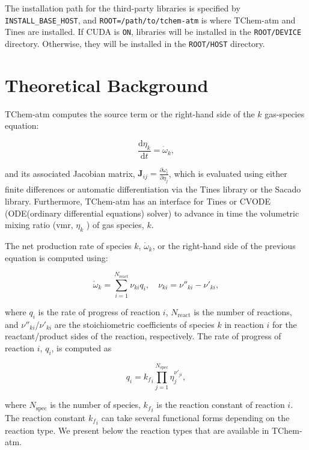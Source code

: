 \documentclass[report, 12pt]{SANDreport}
\newcommand{\dif}{\mathrm{d}}
\begin{document}
The installation path for the third-party libraries is specified by \verb|INSTALL_BASE_HOST|, and \verb|ROOT=/path/to/tchem-atm| is where TChem-atm and Tines are installed. If CUDA is \verb|ON|, libraries will be installed in the \verb|ROOT/DEVICE| directory. Otherwise, they will be installed in the \verb|ROOT/HOST| directory.

\chapter{Theoretical Background}
\label{ch:theo}
TChem-atm computes the source term or the right-hand side of the $k$ gas-species equation:

\begin{equation}\label{eq:ode_vmr}
  \frac{\dif{} \eta_k}{\dif{} t}=\dot{\omega}_k,
\end{equation}

and its associated Jacobian matrix, $\textbf{J}_{ij} = \frac{\partial \dot{\omega}_i}{\partial \eta_j }$, which is evaluated using either finite differences or automatic differentiation via the Tines library or the Sacado library. Furthermore, TChem-atm has an interface for Tines or CVODE (ODE(ordinary differential equations) solver) to advance in time the volumetric mixing ratio (vmr, $\eta_k$ ) of gas species, $k$.

The net production rate of species $k$, $\dot{\omega}_k$, or the right-hand side of the previous equation is computed using:

\begin{equation}\label{eq:net_production_rates}
  \dot{\omega}_k=\sum_{i=1}^{N_{\text{react}}}\nu_{ki}q_i,\quad \nu_{ki}=\nu''_{ki}-\nu'_{ki},
\end{equation}

where $q_i$ is the rate of progress of reaction $i$, $N_{\text{react}}$ is the number of reactions, and $\nu''_{ki}$/$\nu'_{ki}$ are the stoichiometric coefficients of species $k$ in reaction $i$ for the reactant/product sides of the reaction, respectively. The rate of progress of reaction $i$, $q_i$, is computed as

\begin{equation}\label{eq:rate_of_progress}
  q_i={k_f}_i\prod_{j=1}^{N_{\text{spec}}}\eta_j^{\nu'_{ji}},
\end{equation}

where $N_{\text{spec}}$ is the number of species, ${k_f}_i$ is the reaction constant of reaction $i$. The reaction constant ${k_f}_i$ can take several functional forms depending on the reaction type. We present below the reaction types that are available in TChem-atm.
\end{document}
